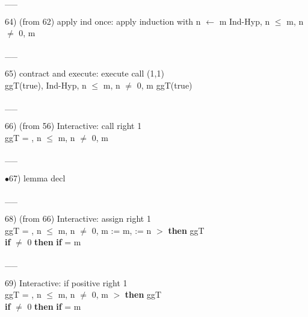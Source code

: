 \documentclass[a4paper]{article}
\begin{document}
\vspace{-1.5ex}\_\hrulefill \_

64)  (from 62) apply ind once: apply induction  with n $\leftarrow$ m %
Ind-Hyp, n $\le$ m, n $\neq$ 0, m %

\vspace{-1.5ex}\_\hrulefill \_

65) contract and execute: execute call  (1,1)\\
\tabf \Do ggT\Dc (true), Ind-Hyp, n $\le$ m, n $\neq$ 0, m %
\Fol \Do ggT\Dc (true)

\vspace{-1.5ex}\_\hrulefill \_

66)  (from 56) Interactive: call right  1\\
\Do ggT\Dc {} = , n $\le$ m, n $\neq$ 0, m %

\vspace{-1.5ex}\_\hrulefill \_

$\bullet$67) lemma decl \\
 \Fol 

\vspace{-1.5ex}\_\hrulefill \_

68)  (from 66) Interactive: assign right  1\\
\tabf \Do ggT\Dc {} = , n $\le$ m, n $\neq$ 0, m %
\Fol \Do {} := m,  := n\Dc
{}  $>$  {\bf then} ggT \\
 \tabf \tabudo{}\tabudc{} {\bf if}  $\neq$ 0 {\bf then} {\bf if}  %
{} = m

\vspace{-1.5ex}\_\hrulefill \_

69) Interactive: if positive right  1\\
\tabf \Do ggT\Dc {} = , n $\le$ m, n $\neq$ 0, m %
\Fol {}  $>$  {\bf then} ggT \\
 \tabf {} {\bf if}  $\neq$ 0 {\bf then} {\bf if}  %
{} = m
\end{document}
